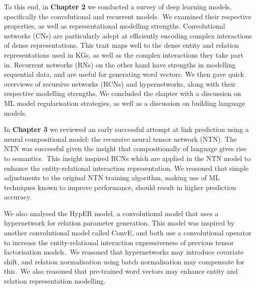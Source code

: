 \noindent To this end, in \textbf{Chapter 2} we conducted a survey of deep learning models, specifically the convolutional and recurrent models.\ We examined their respective properties, as well as representational modelling strengths. Convolutional networks (CNs) are particularly adept at efficiently encoding complex interactions of dense representations. This trait maps well to the dense entity and relation representations used in KGs, as well as the complex interactions they take part in. Recurrent networks (RNs) on the other hand have strengths in modelling sequential data, and are useful for generating word vectors. We then gave quick overviews of recursive networks (RCNs) and hypernetworks, along with their respective modelling strengths. We concluded the chapter with a discussion on ML model regularisation strategies, as well as a discussion on building language models. \par

\noindent In \textbf{Chapter 3} we reviewed an early successful attempt at link prediction using a neural compositional model: the recursive neural tensor network (NTN). The NTN was successful given the insight that compositionally of language gives rise to semantics.\ This insight inspired RCNs which are applied in the NTN model to enhance the entity-relational interaction representation. We reasoned that simple adjustments to the original NTN training algorithm, making use of ML techniques known to improve performance, should result in higher prediction accuracy. \par 

\noindent We also analysed the HypER model, a convolutional model that uses a hypernetwork for relation parameter generation. This model was inspired by another convolutional model called ConvE, and both use a convolutional operator to increase the entity-relational interaction expressiveness of previous tensor factorisation models.\ We reasoned that hypernetworks may introduce covariate shift, and relation normalisation using batch normalisation may compensate for this.\ We also reasoned that pre-trained word vectors may enhance entity and relation representation modelling. \par

